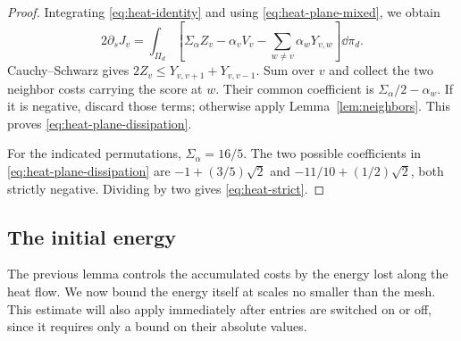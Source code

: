 \begin{proof}
Integrating \eqref{eq:heat-identity} and using
\eqref{eq:heat-plane-mixed}, we obtain
\[
 2\partial_sJ_v=\int_{\Pi_d}
 \left[\Sigma_\alpha Z_v-\alpha_vV_v
                   -\sum_{w\ne v}\alpha_wY_{v,w}\right]\dd\pi_d.
\]
Cauchy--Schwarz gives $2Z_v\le Y_{v,v+1}+Y_{v,v-1}$.  Sum over $v$ and
collect the two neighbor costs carrying the score at $w$.  Their common
coefficient is $\Sigma_\alpha/2-\alpha_w$.  If it is negative, discard
those terms; otherwise apply Lemma~\ref{lem:neighbors}.  This proves
\eqref{eq:heat-plane-dissipation}.

For the indicated permutations, $\Sigma_\alpha=16/5$.  The two possible
coefficients in \eqref{eq:heat-plane-dissipation} are
$-1+(3/5)\sqrt2$ and $-11/10+(1/2)\sqrt2$, both strictly negative. Dividing by two gives
\eqref{eq:heat-strict}.
\end{proof}

\subsection{The initial energy}
The previous lemma controls the accumulated costs by the energy lost along
the heat flow. We now bound the energy itself at scales no smaller than the
mesh. This estimate will also apply immediately after entries are switched
on or off, since it requires only a bound on their absolute values.

